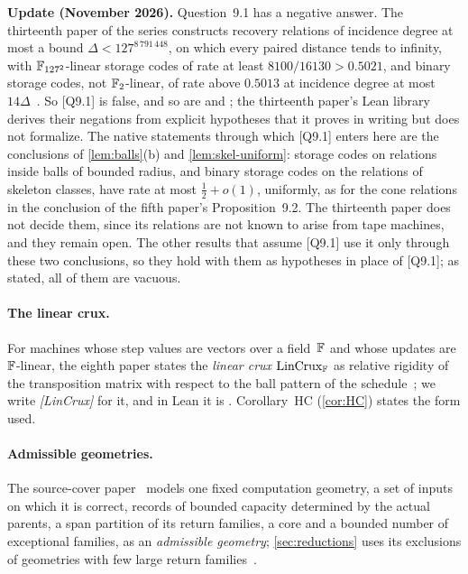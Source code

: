 \textbf{Update (November 2026).} Question~9.1 has a negative answer. The thirteenth paper of the series constructs
recovery relations of incidence degree at most a bound $\Delta<127^{8\,791\,448}$, on which every paired distance tends
to infinity, with $\mathbb{F}_{127^2}$-linear storage codes of rate at least $8100/16130>0.5021$, and binary storage codes, not
$\mathbb{F}_2$-linear, of rate above $0.5013$ at incidence degree at most
$14\Delta$~\cite[Theorem~A and Corollary~A$'$]{StorageCodes2026}. So [Q9.1] is false, and so are 
and ; the thirteenth paper's Lean library derives their negations from explicit hypotheses
that it proves in writing but does not formalize. The native statements through which [Q9.1] enters here are the
conclusions of \cref{lem:balls}(b) and \cref{lem:skel-uniform}: storage codes on relations inside balls of bounded
radius, and binary storage codes on the relations of skeleton classes, have rate at most $\frac12+o(1)$, uniformly, as
for the cone relations in the conclusion of the fifth paper's Proposition~9.2. The thirteenth paper does not decide them,
since its relations are not known to arise from tape machines, and they remain open. The other results that assume
[Q9.1] use it only through these two conclusions, so they hold with them as hypotheses in place of [Q9.1]; as stated,
all of them are vacuous.

\paragraph{The linear crux.} For machines whose step values are vectors over a field~$\mathbb{F}$ and whose updates are
$\mathbb{F}$-linear, the eighth paper states the \emph{linear crux} $\mathrm{LinCrux}_{\mathbb{F}}$ as relative rigidity of the transposition
matrix with respect to the ball pattern of the schedule~\cite[Definition~7.4 and Theorem~7.5]{BoundedNesting2026}; we
write \emph{[LinCrux]} for it, and in Lean it is . Corollary~HC (\cref{cor:HC}) states the
form used.

\paragraph{Admissible geometries.} The source-cover paper~\cite[Definition~2.2]{SourceCovers2026} models one fixed
computation geometry, a set of inputs on which it is correct, records of bounded capacity determined by the actual
parents, a span partition of its return families, a core and a bounded number of exceptional families, as an
\emph{admissible geometry}; \cref{sec:reductions} uses its exclusions of geometries with few large return
families~\cite[Corollaries~4.3 and~4.5]{SourceCovers2026}.

